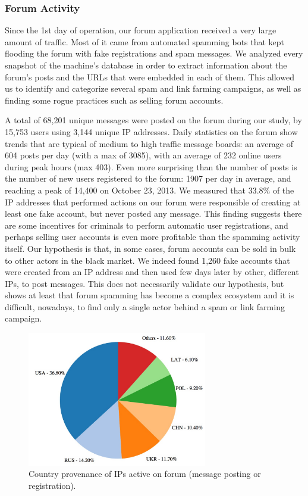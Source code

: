 \subsubsection{Forum Activity}

Since the 1st day of operation, our forum application received a very large amount of traffic. Most of it came from automated spamming bots that kept flooding the forum with fake registrations and spam messages. We analyzed every snapshot of the machine's database in order to extract information about the forum's posts and the URLs that were embedded in each of them. This allowed us to identify and categorize several spam and link farming campaigns, as well as finding some rogue practices such as selling forum accounts.

A total of 68,201 unique messages were posted on the forum during our study, by 15,753 users using 3,144 unique IP addresses. Daily statistics on the forum show trends that are typical of medium to high traffic message boards: an average of 604 posts per day (with a max of 3085), with an average of 232 online users during peak hours (max 403).
Even more surprising than the number of posts is the number of new users registered to the forum: 1907 per day in average, and reaching a peak of 14,400 on October 23, 2013. We measured that 33.8\% of the IP addresses that performed actions on our forum were responsible of creating at least one fake account, but never posted any message. This finding suggests there are some incentives for criminals to perform automatic user registrations, and perhaps selling user accounts is even more profitable than the spamming activity itself. Our hypothesis is that, in some cases, forum accounts can be sold in bulk to other actors in the black market. We indeed found 1,260 fake accounts that were created from an IP address and then used few days later by other, different IPs, to post messages. This does not necessarily validate our hypothesis, but shows at least that forum spamming has become a complex ecosystem and it is difficult, nowadays, to find only a single actor behind a spam or link farming campaign.

\begin{figure}[tbh]
\centerline{\includegraphics[width=0.7\textwidth]{Images/spamCountriesIP.jpg}}
\caption{Country provenance of IPs active on forum (message posting or registration).\label{fig:spamCountriesIP}}
\end{figure}

